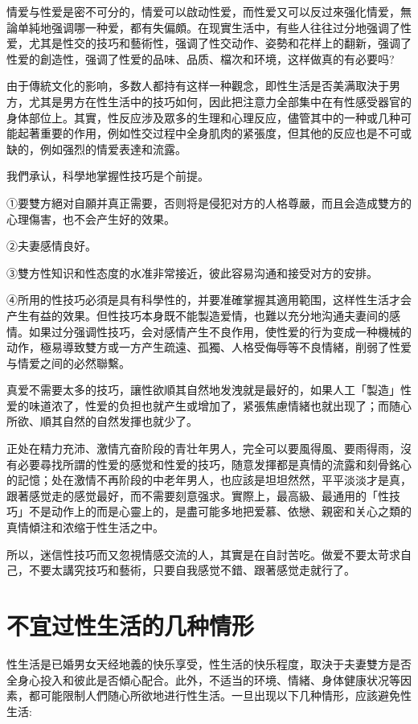 \documentclass[12pt,UTF8]{ctexbook}
\begin{document}
情爱与性爱是密不可分的，情爱可以啟动性爱，而性爱又可以反过來强化情爱，無論单純地强调哪一种爱，都有失偏頗。在现實生活中，有些人往往过分地强调了性爱，尤其是性交的技巧和藝術性，强调了性交动作、姿勢和花样上的翻新，强调了性爱的創造性，强调了性爱的品味、品质、檔次和环境，这样做真的有必要吗?

由于傳統文化的影响，多数人都持有这样一种觀念，即性生活是否美满取決于男方，尤其是男方在性生活中的技巧如何，因此把注意力全部集中在有性感受器官的身体部位上。其實，性反应涉及眾多的生理和心理反应，儘管其中的一种或几种可能起著重要的作用，例如性交过程中全身肌肉的紧張度，但其他的反应也是不可或缺的，例如强烈的情爱表達和流露。

我們承认，科學地掌握性技巧是个前提。

①要雙方絕对自願并真正需要，否则将是侵犯对方的人格尊嚴，而且会造成雙方的心理傷害，也不会产生好的效果。

②夫妻感情良好。

③雙方性知识和性态度的水准非常接近，彼此容易沟通和接受对方的安排。

④所用的性技巧必須是具有科學性的，并要准確掌握其適用範围，这样性生活才会产生有益的效果。但性技巧本身既不能製造爱情，也難以充分地沟通夫妻间的感情。如果过分强调性技巧，会对感情产生不良作用，使性爱的行为变成一种機械的动作，極易導致雙方或一方产生疏遠、孤獨、人格受侮辱等不良情緒，削弱了性爱与情爱之间的必然聯繫。

真爱不需要太多的技巧，讓性欲順其自然地发洩就是最好的，如果人工「製造」性爱的味道浓了，性爱的负担也就产生或增加了，紧張焦慮情緒也就出现了；而随心所欲、順其自然的自然发揮也就少了。

正处在精力充沛、激情亢奋阶段的青壮年男人，完全可以要風得風、要雨得雨，沒有必要尋找所謂的性爱的感觉和性爱的技巧，随意发揮都是真情的流露和刻骨銘心的記憶；处在激情不再阶段的中老年男人，也应該是坦坦然然，平平淡淡才是真，跟著感觉走的感觉最好，而不需要刻意强求。實際上，最高級、最通用的「性技巧」不是动作上的而是心靈上的，是盡可能多地把爱慕、依戀、親密和关心之類的真情傾注和浓缩于性生活之中。

所以，迷信性技巧而又忽視情感交流的人，其實是在自討苦吃。做爱不要太苛求自己，不要太講究技巧和藝術，只要自我感觉不錯、跟著感觉走就行了。

\section{不宜过性生活的几种情形}

性生活是已婚男女天经地義的快乐享受，性生活的快乐程度，取決于夫妻雙方是否全身心投入和彼此是否傾心配合。此外，不适当的环境、情緒、身体健康状况等因素，都可能限制人們随心所欲地进行性生活。一旦出现以下几种情形，应該避免性生活:
\end{document}
